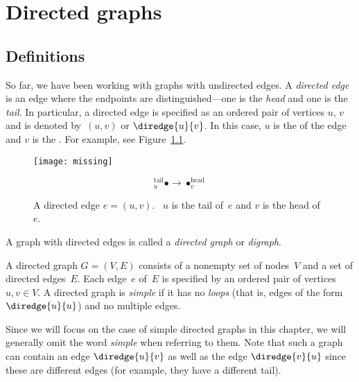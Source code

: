 \chapter{Directed graphs}\label{chap:digraphs}

\section{Definitions}

So far, we have been working with graphs with undirected edges.  A
\emph{directed edge} is an edge where the endpoints are
distinguished---one is the \emph{head} and one is the \emph{tail}.  In
particular, a directed edge is specified as an ordered pair of
vertices $u$, $v$ and is denoted by~$(u, v)$ or $\diredge{u}{v}$.  In this
case, $u$ is the  of the edge and $v$ is the .
For example, see Figure~\ref{fig:6EA}.

\begin{figure}


\texttt{[image: missing]}

\begin{equation*}
    {}_u^{\text{tail}} \bullet \to \bullet_v^{\text{head}}
\end{equation*}

\caption{A directed edge $e = (u, v)$.  \ $u$ is the tail of~$e$ and
  $v$ is the head of~$e$.}

\label{fig:6EA}
\end{figure}

A graph with directed edges is called a \emph{directed graph} or
\emph{digraph}.

\begin{definition}\label{def:digraph}
A directed graph $G = (V, E)$ consists of a nonempty set of nodes~$V$
and a set of directed edges~$E$.  Each edge~$e$ of~$E$ is specified by
an ordered pair of vertices $u, v \in V$.  A directed graph
is \emph{simple} if it has no \emph{loops} (that is, edges of the form
$\diredge{u}{u}$) and no multiple edges.
\end{definition}

Since we will focus on the case of simple directed graphs in this
chapter, we will generally omit the word \emph{simple} when referring
to them.  Note that such a graph can contain an edge $\diredge{u}{v}$
as well as the edge $\diredge{v}{u}$ since these are different edges
(for example, they have a different tail).

